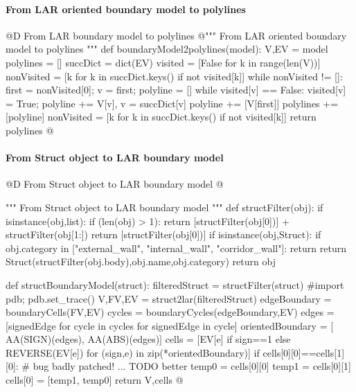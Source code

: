 \documentclass[11pt,oneside]{article}    %
\begin{document}
\paragraph{From LAR oriented boundary model to polylines}
@D From LAR boundary model to polylines
@{""" From LAR oriented boundary model to polylines """
def boundaryModel2polylines(model):
    V,EV = model
    polylines = []
    succDict = dict(EV)
    visited = [False for k in range(len(V))]
    nonVisited = [k for k in succDict.keys() if not visited[k]]
    while nonVisited != []:
        first = nonVisited[0]; v = first; polyline = []
        while visited[v] == False:
            visited[v] = True; 
            polyline += V[v], 
            v = succDict[v]
        polyline += [V[first]]
        polylines += [polyline]
        nonVisited = [k for k in succDict.keys() if not visited[k]]
    return polylines
@}



\paragraph{From Struct object to LAR boundary model}
@D From Struct object to LAR boundary model
@{""" From Struct object to LAR boundary model """
def structFilter(obj):
    if isinstance(obj,list):
        if (len(obj) > 1):
            return [structFilter(obj[0])] + structFilter(obj[1:])
        return [structFilter(obj[0])]
    if isinstance(obj,Struct):
        if obj.category in ["external_wall", "internal_wall", "corridor_wall"]:
            return
        return Struct(structFilter(obj.body),obj.name,obj.category)
    return obj

def structBoundaryModel(struct):
    filteredStruct = structFilter(struct)
    #import pdb; pdb.set_trace()
    V,FV,EV = struct2lar(filteredStruct)
    edgeBoundary = boundaryCells(FV,EV)
    cycles = boundaryCycles(edgeBoundary,EV)
    edges = [signedEdge for cycle in cycles for signedEdge in cycle]
    orientedBoundary = [ AA(SIGN)(edges), AA(ABS)(edges)]
    cells = [EV[e] if sign==1 else REVERSE(EV[e]) for (sign,e) in zip(*orientedBoundary)]
    if cells[0][0]==cells[1][0]: # bug badly patched! ... TODO better
        temp0 = cells[0][0]
        temp1 = cells[0][1]
        cells[0] = [temp1, temp0]
    return V,cells
@}
    
\end{document}
